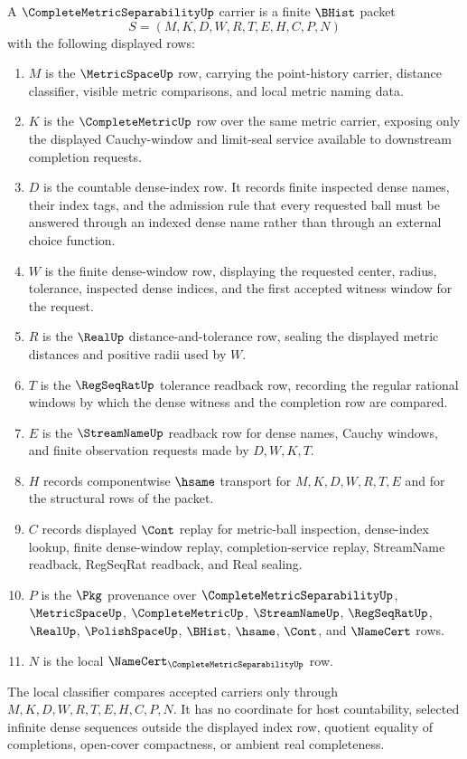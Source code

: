 \begin{definition}
\label{def:complete-metric-separability-carrier}
A $\CompleteMetricSeparabilityUp$ carrier is a finite $\BHist$ packet
$$
S=(M,K,D,W,R,T,E,H,C,P,N)
$$
with the following displayed rows:
\begin{enumerate}
\item $M$ is the $\MetricSpaceUp$ row, carrying the point-history carrier, distance classifier, visible metric comparisons, and local metric naming data.
\item $K$ is the $\CompleteMetricUp$ row over the same metric carrier, exposing only the displayed Cauchy-window and limit-seal service available to downstream completion requests.
\item $D$ is the countable dense-index row. It records finite inspected dense names, their index tags, and the admission rule that every requested ball must be answered through an indexed dense name rather than through an external choice function.
\item $W$ is the finite dense-window row, displaying the requested center, radius, tolerance, inspected dense indices, and the first accepted witness window for the request.
\item $R$ is the $\RealUp$ distance-and-tolerance row, sealing the displayed metric distances and positive radii used by $W$.
\item $T$ is the $\RegSeqRatUp$ tolerance readback row, recording the regular rational windows by which the dense witness and the completion row are compared.
\item $E$ is the $\StreamNameUp$ readback row for dense names, Cauchy windows, and finite observation requests made by $D,W,K,T$.
\item $H$ records componentwise $\hsame$ transport for $M,K,D,W,R,T,E$ and for the structural rows of the packet.
\item $C$ records displayed $\Cont$ replay for metric-ball inspection, dense-index lookup, finite dense-window replay, completion-service replay, StreamName readback, RegSeqRat readback, and Real sealing.
\item $P$ is the $\Pkg$ provenance over $\CompleteMetricSeparabilityUp$, $\MetricSpaceUp$, $\CompleteMetricUp$, $\StreamNameUp$, $\RegSeqRatUp$, $\RealUp$, $\PolishSpaceUp$, $\BHist$, $\hsame$, $\Cont$, and $\NameCert$ rows.
\item $N$ is the local $\NameCert_{\CompleteMetricSeparabilityUp}$ row.
\end{enumerate}
The local classifier compares accepted carriers only through $M,K,D,W,R,T,E,H,C,P,N$. It has no coordinate for host countability, selected infinite dense sequences outside the displayed index row, quotient equality of completions, open-cover compactness, or ambient real completeness.
\end{definition}

